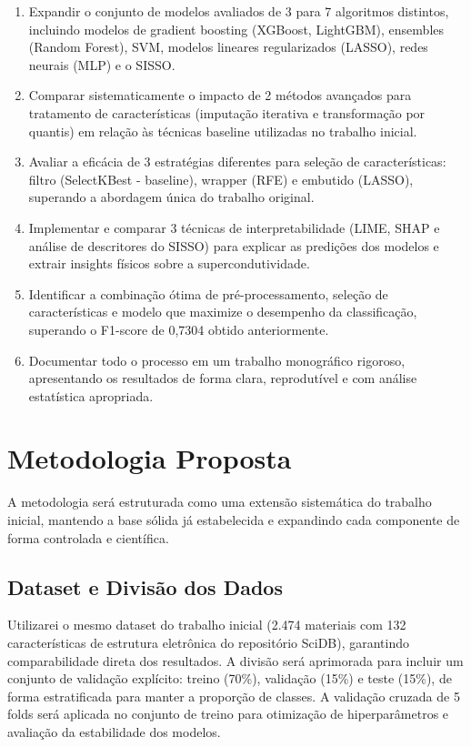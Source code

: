 \documentclass[12pt, a4paper]{article}
\begin{document}
\begin{enumerate}
    \item Expandir o conjunto de modelos avaliados de 3 para 7 algoritmos distintos, incluindo modelos de gradient boosting (XGBoost, LightGBM), ensembles (Random Forest), SVM, modelos lineares regularizados (LASSO), redes neurais (MLP) e o SISSO.
    \item Comparar sistematicamente o impacto de 2 métodos avançados para tratamento de características (imputação iterativa e transformação por quantis) em relação às técnicas baseline utilizadas no trabalho inicial.
    \item Avaliar a eficácia de 3 estratégias diferentes para seleção de características: filtro (SelectKBest - baseline), wrapper (RFE) e embutido (LASSO), superando a abordagem única do trabalho original.
    \item Implementar e comparar 3 técnicas de interpretabilidade (LIME, SHAP e análise de descritores do SISSO) para explicar as predições dos modelos e extrair insights físicos sobre a supercondutividade.
    \item Identificar a combinação ótima de pré-processamento, seleção de características e modelo que maximize o desempenho da classificação, superando o F1-score de 0,7304 obtido anteriormente.
    \item Documentar todo o processo em um trabalho monográfico rigoroso, apresentando os resultados de forma clara, reprodutível e com análise estatística apropriada.
\end{enumerate}

\section{Metodologia Proposta}

A metodologia será estruturada como uma extensão sistemática do trabalho inicial, mantendo a base sólida já estabelecida e expandindo cada componente de forma controlada e científica.

\subsection{Dataset e Divisão dos Dados}
Utilizarei o mesmo dataset do trabalho inicial (2.474 materiais com 132 características de estrutura eletrônica do repositório SciDB), garantindo comparabilidade direta dos resultados. A divisão será aprimorada para incluir um conjunto de validação explícito: treino (70\%), validação (15\%) e teste (15\%), de forma estratificada para manter a proporção de classes. A validação cruzada de 5 folds será aplicada no conjunto de treino para otimização de hiperparâmetros e avaliação da estabilidade dos modelos.
\end{document}
